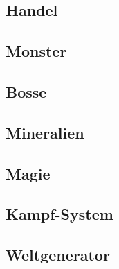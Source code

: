 \subsection{Handel}
\label{subsec:handel}

\subsection{Monster}
\label{subsec:monster}

\subsection{Bosse}
\label{subsec:bosse}

\subsection{Mineralien}
\label{subsec:mineralien}

\subsection{Magie}
\label{subsec:magie}

\subsection{Kampf-System}
\label{subsec:kamp-system}

\subsection{Weltgenerator}
\label{subsec:weltgenerator}

